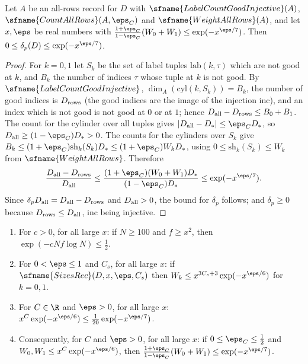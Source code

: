 \begin{lemma}\label{pf:top-shape:delp}
Let $A$ be an all-rows record for $D$ with $\sfname{LabelCountGoodInjective}(A)$, $\sfname{CountAllRows}(A,\eps_C)$
and $\sfname{WeightAllRows}(A)$, and let $x,\eps$ be real numbers with
$\frac{1+\eps_C}{1-\eps_C}(W_0+W_1)\le\exp(-x^{\eps/7})$. Then $0\le\delta_p(D)\le\exp(-x^{\eps/7})$.
\end{lemma}

\begin{proof}
For $k=0,1$ let $S_k$ be the set of label tuples $\mathrm{lab}(k,\tau)$ which are not good at $k$, and $B_k$ the number
of indices $\tau$ whose tuple at $k$ is not good. By $\sfname{LabelCountGoodInjective}$, $\dim_A(\mathrm{cyl}(k,S_k))=B_k$,
the number of good indices is $D_{\rm rows}$ (the good indices are the image of the injection $\mathrm{inc}$), and an
index which is not good is not good at $0$ or at $1$; hence $D_{\rm all}-D_{\rm rows}\le B_0+B_1$. The count for the
cylinder over all tuples gives $|D_{\rm all}-D_*|\le\eps_CD_*$, so $D_{\rm all}\ge(1-\eps_C)D_*>0$. The counts for the
cylinders over $S_k$ give $B_k\le(1+\eps_C)\mathrm{sh}_k(S_k)D_*\le(1+\eps_C)W_kD_*$, using $0\le\mathrm{sh}_k(S_k)\le
W_k$ from $\sfname{WeightAllRows}$. Therefore
\[
\frac{D_{\rm all}-D_{\rm rows}}{D_{\rm all}}\le\frac{(1+\eps_C)(W_0+W_1)D_*}{(1-\eps_C)D_*}\le\exp(-x^{\eps/7}).
\]
Since $\delta_pD_{\rm all}=D_{\rm all}-D_{\rm rows}$ and $D_{\rm all}>0$, the bound for $\delta_p$ follows; and
$\delta_p\ge0$ because $D_{\rm rows}\le D_{\rm all}$, $\mathrm{inc}$ being injective.
\end{proof}

\begin{lemma}\label{pf:top-shape:numbers}
\begin{enumerate}[label=(\alph*)]
\item For $c>0$, for all large $x$: if $N\ge100$ and $f\ge x^2$, then $\exp(-cNf\log N)\le\frac12$.
\item For $0<\eps\le1$ and $C_s$, for all large $x$: if $\sfname{SizesRec}(D,x,\eps,C_s)$ then $W_k\le
x^{3C_s+3}\exp(-x^{\eps/6})$ for $k=0,1$.
\item For $C\in\R$ and $\eps>0$, for all large $x$: $x^C\exp(-x^{\eps/6})\le\frac1{20}\exp(-x^{\eps/7})$.
\item Consequently, for $C$ and $\eps>0$, for all large $x$: if $0\le\eps_C\le\frac12$ and
$W_0,W_1\le x^C\exp(-x^{\eps/6})$, then $\frac{1+\eps_C}{1-\eps_C}(W_0+W_1)\le\exp(-x^{\eps/7})$.
\end{enumerate}
\end{lemma}

